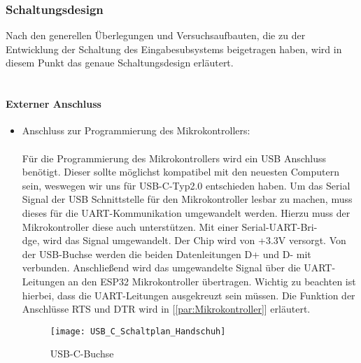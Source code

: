 \documentclass[titlepage,12pt,twoside]{article}
\begin{document}
\newpage
\subsubsection{Schaltungsdesign}
Nach den generellen Überlegungen und Versuchsaufbauten, die zu der Entwicklung der Schaltung des Eingabesubsystems beigetragen haben, wird in diesem Punkt 
das genaue Schaltungsdesign erläutert. \\
\\
\paragraph{Externer Anschluss}
\label{par:Externe Anschlüsse}
\hfill \break
\hfill \break
\begin{itemize}
	\item Anschluss zur Programmierung des Mikrokontrollers: \\
		  \\
		  Für die Programmierung des Mikrokontrollers wird ein USB Anschluss benötigt. Dieser sollte möglichst kompatibel mit
		  den neuesten Computern sein, weswegen wir uns für USB-C-Typ2.0 entschieden haben. Um das Serial Signal der USB Schnittstelle
		  für den Mikrokontroller lesbar zu machen, muss dieses für die UART-Kommunikation umgewandelt werden. Hierzu muss der Mikrokontroller
		  diese auch unterstützen. Mit einer Serial-UART-Bri-\\dge, wird das Signal umgewandelt. Der Chip wird von +3.3V versorgt.
		  Von der USB-Buchse werden die beiden Datenleitungen D+ und D- mit verbunden. Anschließend wird das umgewandelte Signal 
		  über die UART-Leitungen an den ESP32 Mikrokontroller übertragen. Wichtig zu beachten ist hierbei, dass die UART-Leitungen
		  ausgekreuzt sein müssen. Die Funktion der Anschlüsse RTS und DTR wird in [\textcolor{blue}{\autoref{par:Mikrokontroller}}] erläutert. \\
		  \begin{figure}[H]
			\begin{center}
				\scalebox{0.5}
				{\texttt{[image: USB\_C\_Schaltplan\_Handschuh]}}
				\caption{USB-C-Buchse}
				\label{fig:USB_C_Schaltplan_Handschuh}				
			\end{center}
		\end{figure}
\end{itemize}
\newpage
\end{document}

